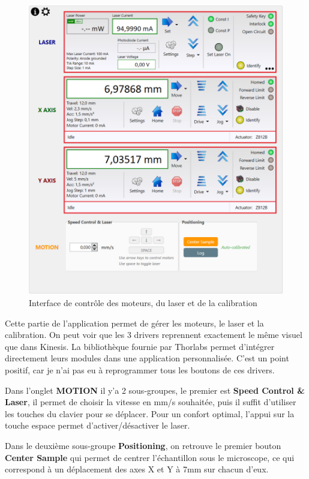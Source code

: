\begin{figure}[H]
    \centering
    \includegraphics[width=\textwidth]{assets/figures/Application_ServoVision/Moteurs_Laser_Calibration.png}
    \caption{Interface de contrôle des moteurs, du laser et de la calibration}
    \label{Moteurs_Laser_Calibration}
\end{figure}
Cette partie de l'application permet de gérer les moteurs, le laser et la calibration. On peut voir que les 3 drivers reprennent exactement le même visuel que dans Kinesis. La bibliothèque fournie par Thorlabs permet d'intégrer directement leurs modules dans une application personnalisée. C'est un point positif, car je n'ai pas eu à reprogrammer tous les boutons de ces drivers.

Dans l'onglet \textcolor[RGB]{241,158,56}{\textbf{MOTION}} il y'a 2 sous-groupes, le premier est \textbf{Speed Control \& Laser}, il permet de choisir la vitesse en mm/s souhaitée, puis il suffit d'utiliser les touches du clavier pour se déplacer. Pour un confort optimal, l'appui sur la touche espace permet d'activer/désactiver le laser.

\newpage
Dans le deuxième sous-groupe \textbf{Positioning}, on retrouve le premier bouton \textcolor[RGB]{241,158,56}{\textbf{Center Sample}} qui permet de centrer l'échantillon sous le microscope, ce qui correspond à un déplacement des axes X et Y à 7mm sur chacun d'eux.

